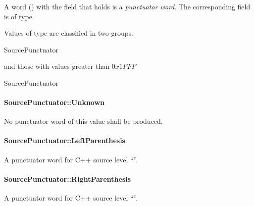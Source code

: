 \subsubsection{}
\label{sec:ifc:WordSort:Punctuator}

A word ()  with the  field that holds
 is a \emph{punctuator word}.  The corresponding 
 field is of type 

Values of type  are classified in two groups.
\begin{Enumeration}{SourcePunctuator}
\end{Enumeration}
and those with values greater than $0x1FFF$
\begin{Enumeration}{SourcePunctuator}\setcounter{enumi}{8190}
\end{Enumeration}

\paragraph{SourcePunctuator::Unknown}
\label{sec:ifc:SourcePunctuator:Unknown}

No punctuator word of this value shall be produced.

\paragraph{SourcePunctuator::LeftParenthesis}
\label{sec:ifc:SourcePunctuator:LeftParenthesis}

A punctuator word for C++ source level ``\code{(}''.

\paragraph{SourcePunctuator::RightParenthesis}
\label{sec:ifc:SourcePunctuator:RightParenthesis}

A punctuator word for C++ source level ``\code{)}''.


